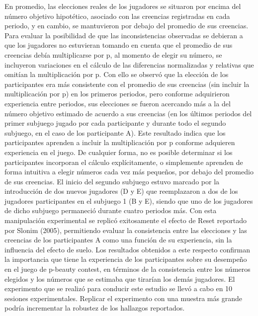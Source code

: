 En promedio, las elecciones reales de los jugadores se situaron por encima del número objetivo hipotético, asociado con las  creencias registradas en cada periodo,  y en cambio, se mantuvieron por debajo del promedio de sus creencias.
Para evaluar la posibilidad de que las inconsistencias observadas se debieran a que los jugadores no estuvieran tomando en cuenta que el promedio de sus creencias debía multiplicarse por p, al momento de elegir su número, se incluyeron variaciones en el cálculo de las diferencias normalizadas y relativas que omitían la multiplicación por p. Con ello se observó que la elección de los participantes era más consistente con el promedio de sus creencias (sin incluir la multiplicación por p) en los primeros periodos, pero conforme adquirieron experiencia entre periodos, sus elecciones se fueron acercando más a la del número objetivo estimado de acuerdo a sus creencias (en los últimos periodos del primer subjuego jugado por cada participante y durante todo el segundo subjuego, en el caso de los participante A). Este resultado indica que los participantes aprenden a incluir la multiplicación por p conforme adquieren experiencia en el juego. De cualquier forma, no es posible determinar si los participantes incorporan el cálculo explícitamente, o simplemente aprenden de forma intuitiva a elegir números cada vez más pequeños, por debajo del promedio de sus creencias.
El inicio del segundo subjuego estuvo marcado por la introducción de dos nuevos jugadores (D y E) que reemplazaron a dos de los jugadores participantes en el subjuego 1 (B y E), siendo que uno de los jugadores de dicho subjuego permaneció durante cuatro periodos más. Con esta manipulación experimental se replicó exitosamente el efecto de Reset reportado por Slonim (2005), permitiendo evaluar la consistencia entre las elecciones y las creencias de los participantes A como una función de su experiencia, sin la influencia del efecto de suelo. Los resultados obtenidos a este respecto confirman la importancia que tiene la experiencia de los participantes sobre su desempeño en el juego de p-beauty contest, en términos de la consistencia entre los números elegidos y los números que se estimaba que tirarían los demás jugadores.
El experimento que se realizó para conducir este estudio se llevó a cabo en 10 sesiones experimentales. Replicar el experimento con una muestra más grande podría incrementar la robustez de los hallazgos reportados.



